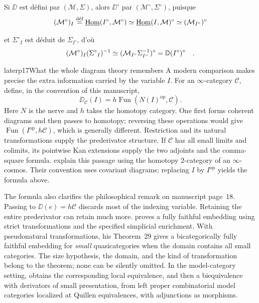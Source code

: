 Si $\DD$ est défini par $(\mathcal{M},\Sigma)$, alors $\DD^\circ$ par $(\mathcal{M}^\circ,\Sigma^\circ)$, puisque
\[
(\mathcal{M}^\circ)_I \defeq \uHom(I^\circ,\mathcal{M}^\circ) \simeq \uHom(I,\mathcal{M})^\circ \simeq (\mathcal{M}_{I^\circ})^\circ
\]


et $\Sigma^\circ{}_I$ est déduit de $\Sigma_{I^\circ}$, d'où
\[
(\mathcal{M}^\circ)_I(\Sigma^\circ{}_I)^{-1} \simeq (\mathcal{M}_{I^\circ}\Sigma_{I^\circ}^{-1})^\circ = \D(I^\circ)^\circ \quad .
\]


\begin{dcomment}{later}{p17}{What the whole diagram theory remembers}
A modern comparison makes precise the extra information carried by the variable $I$. For an $\infty$-category $\mathcal C$, define, in the convention of this manuscript,
\[
\DD_{\mathcal C}(I)=h\operatorname{Fun}(N(I)^{\mathrm{op}},\mathcal C).
\]
Here $N$ is the nerve and $h$ takes the homotopy category. One first forms coherent diagrams and then passes to homotopy; reversing these operations would give $\operatorname{Fun}(I^{\mathrm{op}},h\mathcal C)$, which is generally different. Restriction and its natural transformations supply the prederivator structure. If $\mathcal C$ has all small limits and colimits, its pointwise Kan extensions supply the two adjoints and the comma-square formula. \citet[\S5.3, especially Proposition~5.3.9 and Remark~5.3.10]{RiehlVerity2017} explain this passage using the homotopy $2$-category of an $\infty$-cosmos. Their convention uses covariant diagrams; replacing $I$ by $I^{\mathrm{op}}$ yields the formula above.

The formula also clarifies the philosophical remark on manuscript page~18. Passing to $\DD(e)=h\mathcal C$ discards most of the indexing variable. Retaining the entire prederivator can retain much more. \citet[Theorem~19 and Corollary~20]{Arlin2020} proves a fully faithful embedding using strict transformations and the specified simplicial enrichment. With pseudonatural transformations, his Theorem~29 gives a bicategorically fully faithful embedding for \emph{small} quasicategories when the domain contains all small categories. The size hypothesis, the domain, and the kind of transformation belong to the theorem; none can be silently omitted. In the model-category setting, \citet[Theorems~3.3.2 and~3.4.4]{Renaudin2009} obtains the corresponding local equivalence, and then a biequivalence with derivators of small presentation, from left proper combinatorial model categories localized at Quillen equivalences, with adjunctions as morphisms.


\end{dcomment}

